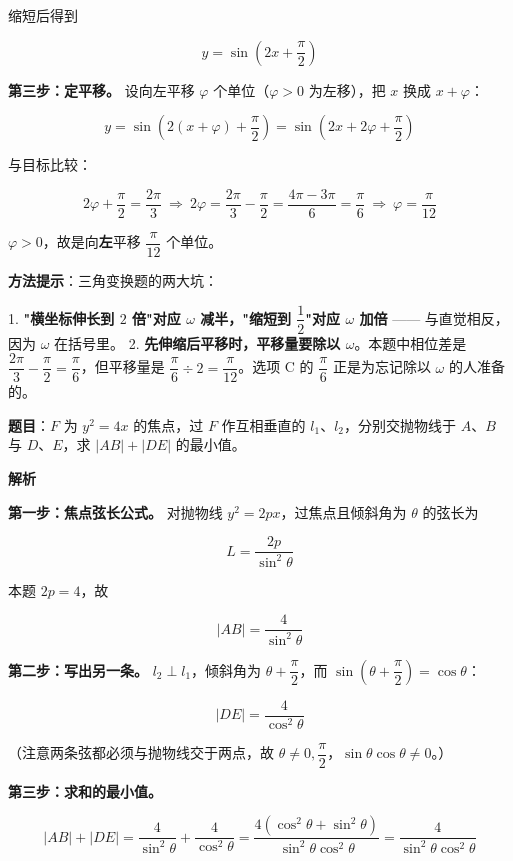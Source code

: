 缩短后得到

\[y=\sin\left(2x+\frac\pi2\right)\]

\textbf{第三步：定平移。} 设向左平移 $\varphi$ 个单位（$\varphi>0$ 为左移），把 $x$ 换成 $x+\varphi$：

\[y=\sin\left(2(x+\varphi)+\frac\pi2\right)=\sin\left(2x+2\varphi+\frac\pi2\right)\]

与目标比较：

\[2\varphi+\frac\pi2=\frac{2\pi}3\ \Longrightarrow\ 2\varphi=\frac{2\pi}3-\frac\pi2=\frac{4\pi-3\pi}6=\frac\pi6\ \Longrightarrow\ \varphi=\frac\pi{12}\]

$\varphi>0$，故是向\textbf{左}平移 $\dfrac\pi{12}$ 个单位。


\begin{gktip}
\textbf{方法提示}：三角变换题的两大坑：

1. \textbf{"横坐标伸长到 $2$ 倍"对应 $\omega$ 减半，"缩短到 $\dfrac12$"对应 $\omega$ 加倍} —— 与直觉相反，因为 $\omega$ 在括号里。
2. \textbf{先伸缩后平移时，平移量要除以 $\omega$}。本题中相位差是 $\dfrac{2\pi}3-\dfrac\pi2=\dfrac\pi6$，但平移量是 $\dfrac\pi6\div2=\dfrac\pi{12}$。选项 C 的 $\dfrac\pi6$ 正是为忘记除以 $\omega$ 的人准备的。
\end{gktip}

\par\medskip


\textbf{题目}：$F$ 为 $y^{2}=4x$ 的焦点，过 $F$ 作互相垂直的 $l_1$、$l_2$，分别交抛物线于 $A$、$B$ 与 $D$、$E$，求 $|AB|+|DE|$ 的最小值。

\textbf{解析}

\textbf{第一步：焦点弦长公式。} 对抛物线 $y^{2}=2px$，过焦点且倾斜角为 $\theta$ 的弦长为

\[L=\frac{2p}{\sin^{2}\theta}\]

本题 $2p=4$，故

\[|AB|=\frac4{\sin^{2}\theta}\]

\textbf{第二步：写出另一条。} $l_2\perp l_1$，倾斜角为 $\theta+\dfrac\pi2$，而 $\sin\left(\theta+\dfrac\pi2\right)=\cos\theta$：

\[|DE|=\frac4{\cos^{2}\theta}\]

（注意两条弦都必须与抛物线交于两点，故 $\theta\ne0,\dfrac\pi2$，$\sin\theta\cos\theta\ne0$。）

\textbf{第三步：求和的最小值。}

\[|AB|+|DE|=\frac4{\sin^{2}\theta}+\frac4{\cos^{2}\theta}=\frac{4\left(\cos^{2}\theta+\sin^{2}\theta\right)}{\sin^{2}\theta\cos^{2}\theta}=\frac4{\sin^{2}\theta\cos^{2}\theta}\]

